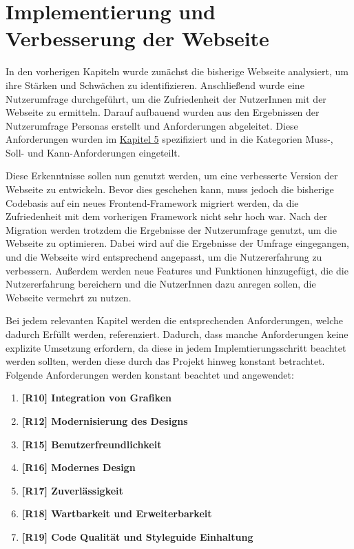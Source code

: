 
\chapter{Implementierung und Verbesserung der Webseite}
\label{chapter:6}

In den vorherigen Kapiteln wurde zunächst die bisherige Webseite analysiert, um ihre Stärken und Schwächen zu identifizieren.
Anschließend wurde eine Nutzerumfrage durchgeführt, um die Zufriedenheit der NutzerInnen mit der Webseite zu ermitteln.
Darauf aufbauend wurden aus den Ergebnissen der Nutzerumfrage Personas erstellt und Anforderungen abgeleitet.
Diese Anforderungen wurden im \hyperref[chapter:5]{Kapitel 5} spezifiziert und in die Kategorien Muss-, Soll- und Kann-Anforderungen eingeteilt.

Diese Erkenntnisse sollen nun genutzt werden, um eine verbesserte Version der Webseite zu entwickeln.
Bevor dies geschehen kann, muss jedoch die bisherige Codebasis auf ein neues Frontend-Framework migriert werden, da die Zufriedenheit mit dem vorherigen Framework nicht sehr hoch war.
Nach der Migration werden trotzdem die Ergebnisse der Nutzerumfrage genutzt, um die Webseite zu optimieren.
Dabei wird auf die Ergebnisse der Umfrage eingegangen, und die Webseite wird entsprechend angepasst, um die Nutzererfahrung zu verbessern.
Außerdem werden neue Features und Funktionen hinzugefügt, die die Nutzererfahrung bereichern und die NutzerInnen dazu anregen sollen, die Webseite vermehrt zu nutzen.

Bei jedem relevanten Kapitel werden die entsprechenden Anforderungen, welche dadurch Erfüllt werden, referenziert.
Dadurch, dass manche Anforderungen keine explizite Umsetzung erfordern, da diese in jedem Implemtierungsschritt beachtet werden sollten, werden diese durch das Projekt hinweg konstant betrachtet.
Folgende Anforderungen werden konstant beachtet und angewendet:

\begin{enumerate}

    \item \textbf{[R10] Integration von Grafiken}
    \item \textbf{[R12] Modernisierung des Designs}
    \item \textbf{[R15] Benutzerfreundlichkeit}
    \item \textbf{[R16] Modernes Design}
    \item \textbf{[R17] Zuverlässigkeit}
    \item \textbf{[R18] Wartbarkeit und Erweiterbarkeit}
    \item \textbf{[R19] Code Qualität und Styleguide Einhaltung}

\end{enumerate}

